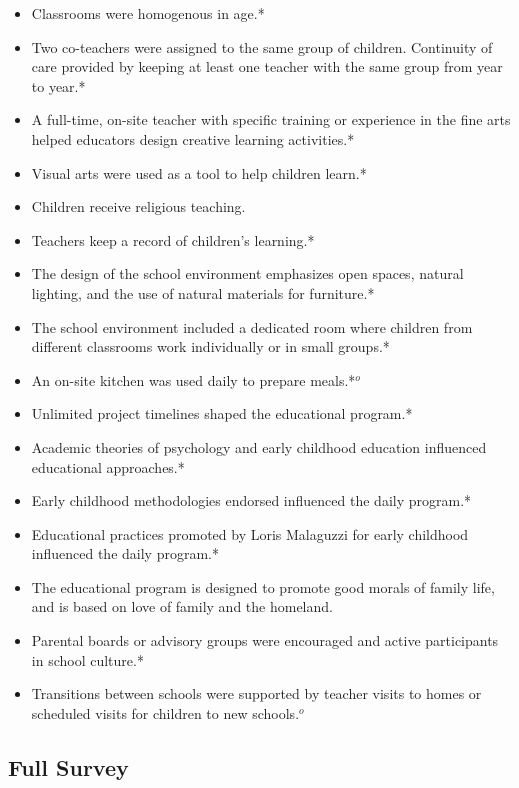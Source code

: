 \begin{itemize}
\begin{itemize}
 	\item Classrooms were homogenous in age.*
 	\item Two co-teachers were assigned to the same group of children. Continuity of care provided by keeping at least one teacher with the same group from year to year.*
 	\item A full-time, on-site teacher with specific training or experience in the fine arts helped educators design creative learning activities.*
 	\item Visual arts were used as a tool to help children learn.*
 	\item Children receive religious teaching.
 	\item Teachers keep a record of children's learning.*
 	\item The design of the school environment emphasizes open spaces, natural lighting, and the use of natural materials for furniture.*
 	\item The school environment included a dedicated room where children from different classrooms work individually or in small groups.*
 	\item An on-site kitchen was used daily to prepare meals.*$^o$
 	\item Unlimited project timelines shaped the educational program.*
 	\item Academic theories of psychology and early childhood education influenced educational approaches.*
 	\item Early childhood methodologies endorsed influenced the daily program.*
 	\item Educational practices promoted by Loris Malaguzzi for early childhood influenced the daily program.*
 	\item The educational program is designed to promote good morals of family life, and is based on love of family and the homeland.
 	\item Parental boards or advisory groups were encouraged and active participants in school culture.*
	\item Transitions between schools were supported by teacher visits to homes or scheduled visits for children to new schools.$^o$
 \end{itemize}
 \end{itemize}

\subsection{Full Survey}

